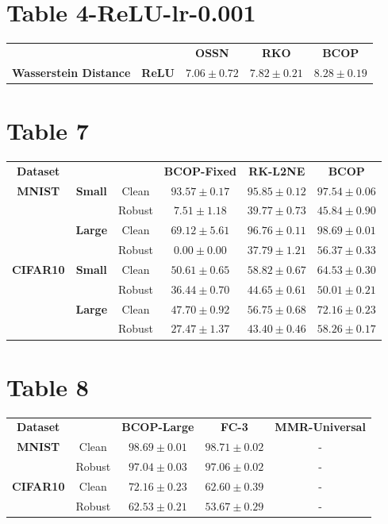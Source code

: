 \documentclass{article}%
\begin{document}
%
\section*{Table 4{-}ReLU{-}lr{-}0.001}%
\label{sec:Table4{-}ReLU{-}lr{-}0.001}%
\begin{tabularx}{\textwidth}{ccccc}%
\textbf{}&\textbf{}&\textbf{OSSN}&\textbf{RKO}&\textbf{BCOP}\\%
\cmidrule{1-5}%
\multirow{1}{*}{\textbf{Wasserstein Distance}}&\textbf{ReLU}&$7.06\pm0.72$&$7.82\pm0.21$&$\mathbf{8.28}\pm0.19$\\%
\end{tabularx}

%
\section*{Table 7}%
\label{sec:Table7}%
\begin{tabularx}{\textwidth}{c|cc|ccc}%
\textbf{Dataset}&\textbf{}&\textbf{}&\textbf{BCOP-Fixed}&\textbf{RK-L2NE}&\textbf{BCOP}\\%
\cmidrule{1-6}%
\multirow{4}{*}{\textbf{{MNIST}}}&\multirow{2}{*}{\textbf{Small}}&Clean&$93.57\pm0.17$&$95.85\pm0.12$&$\mathbf{97.54}\pm0.06$\\%
&&Robust&$7.51\pm1.18$&$39.77\pm0.73$&$\mathbf{45.84}\pm0.90$\\%
\cmidrule{2-6}%
&\multirow{2}{*}{\textbf{Large}}&Clean&$69.12\pm5.61$&$96.76\pm0.11$&$\mathbf{98.69}\pm0.01$\\%
&&Robust&$0.00\pm0.00$&$37.79\pm1.21$&$\mathbf{56.37}\pm0.33$\\%
\cmidrule{1-6}%
\multirow{4}{*}{\textbf{{CIFAR10}}}&\multirow{2}{*}{\textbf{Small}}&Clean&$50.61\pm0.65$&$58.82\pm0.67$&$\mathbf{64.53}\pm0.30$\\%
&&Robust&$36.44\pm0.70$&$44.65\pm0.61$&$\mathbf{50.01}\pm0.21$\\%
\cmidrule{2-6}%
&\multirow{2}{*}{\textbf{Large}}&Clean&$47.70\pm0.92$&$56.75\pm0.68$&$\mathbf{72.16}\pm0.23$\\%
&&Robust&$27.47\pm1.37$&$43.40\pm0.46$&$\mathbf{58.26}\pm0.17$\\%
\cmidrule{1-6}%
\end{tabularx}

%
\section*{Table 8}%
\label{sec:Table8}%
\begin{tabularx}{\textwidth}{c|c|ccc}%
\textbf{Dataset}&&\textbf{BCOP-Large}&\textbf{FC-3}&\textbf{MMR-Universal}\\%
\cmidrule{1-5}%
\multirow{2}{*}{\textbf{{MNIST}}}&Clean&$98.69\pm0.01$&$\mathbf{98.71}\pm0.02$&{-}\\%
&Robust&$97.04\pm0.03$&$\mathbf{97.06}\pm0.02$&{-}\\%
\cmidrule{1-5}%
\multirow{2}{*}{\textbf{{CIFAR10}}}&Clean&$\mathbf{72.16}\pm0.23$&$62.60\pm0.39$&{-}\\%
&Robust&$\mathbf{62.53}\pm0.21$&$53.67\pm0.29$&{-}\\%
\cmidrule{1-5}%
\end{tabularx}
\end{document}
